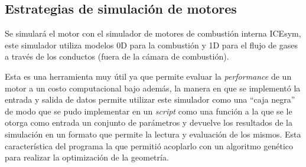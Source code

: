 




\subsection{Estrategias de simulación de motores}
%
Se simulará el motor con el simulador de motores de combustión interna ICEsym,
este simulador utiliza modelos 0D para la combustión y 1D para el flujo de
gases a través de los conductos (fuera de la cámara de combustión).

Esta es una herramienta muy útil ya que permite evaluar la \emph{performance} de
un motor a un costo computacional bajo además, la manera en que se implementó la
entrada y salida de datos permite utilizar este simulador como una ``caja
negra'' de modo que se pudo implementar en un \emph{script} como una función a
la que se le otorga como entrada un conjunto de parámetros y devuelve los
resultados de la simulación en un formato que permite la lectura y evaluación de
los mismos.
%
Esta característica del programa la que permitió acoplarlo con un algoritmo
genético para realizar la optimización de la geometría.


